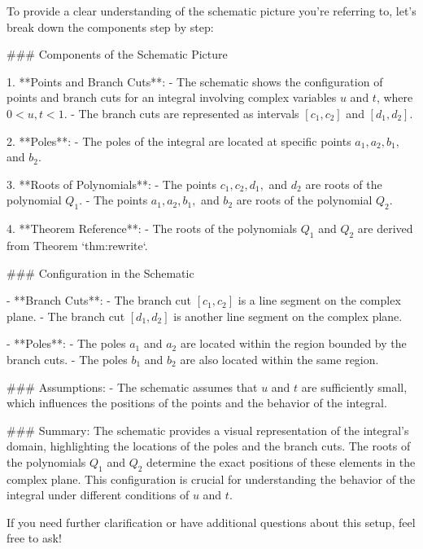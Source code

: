 To provide a clear understanding of the schematic picture you're referring to, let's break down the components step by step:

### Components of the Schematic Picture

1. **Points and Branch Cuts**:
   - The schematic shows the configuration of points and branch cuts for an integral involving complex variables \(u\) and \(t\), where \(0 < u, t < 1\).
   - The branch cuts are represented as intervals \([c_1, c_2]\) and \([d_1, d_2]\).

2. **Poles**:
   - The poles of the integral are located at specific points \(a_1, a_2, b_1,\) and \(b_2\).

3. **Roots of Polynomials**:
   - The points \(c_1, c_2, d_1,\) and \(d_2\) are roots of the polynomial \(Q_1\).
   - The points \(a_1, a_2, b_1,\) and \(b_2\) are roots of the polynomial \(Q_2\).

4. **Theorem Reference**:
   - The roots of the polynomials \(Q_1\) and \(Q_2\) are derived from Theorem `thm:rewrite`.

### Configuration in the Schematic

- **Branch Cuts**:
  - The branch cut \([c_1, c_2]\) is a line segment on the complex plane.
  - The branch cut \([d_1, d_2]\) is another line segment on the complex plane.

- **Poles**:
  - The poles \(a_1\) and \(a_2\) are located within the region bounded by the branch cuts.
  - The poles \(b_1\) and \(b_2\) are also located within the same region.

### Assumptions:
- The schematic assumes that \(u\) and \(t\) are sufficiently small, which influences the positions of the points and the behavior of the integral.

### Summary:
The schematic provides a visual representation of the integral's domain, highlighting the locations of the poles and the branch cuts. The roots of the polynomials \(Q_1\) and \(Q_2\) determine the exact positions of these elements in the complex plane. This configuration is crucial for understanding the behavior of the integral under different conditions of \(u\) and \(t\).

If you need further clarification or have additional questions about this setup, feel free to ask!